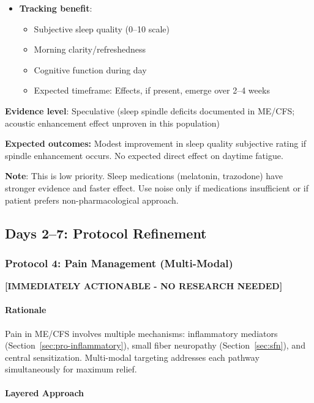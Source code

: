 \begin{recommendation}
\begin{itemize}
    \item \textbf{Tracking benefit}:
    \begin{itemize}
        \item Subjective sleep quality (0--10 scale)
        \item Morning clarity/refreshedness
        \item Cognitive function during day
        \item Expected timeframe: Effects, if present, emerge over 2--4 weeks
    \end{itemize}
\end{itemize}

\textbf{Evidence level}: Speculative (sleep spindle deficits documented in ME/CFS; acoustic enhancement effect unproven in this population)

\textbf{Expected outcomes:} Modest improvement in sleep quality subjective rating if spindle enhancement occurs. No expected direct effect on daytime fatigue.

\textbf{Note}: This is low priority. Sleep medications (melatonin, trazodone) have stronger evidence and faster effect. Use noise only if medications insufficient or if patient prefers non-pharmacological approach.

\end{recommendation}

\subsection{Days 2--7: Protocol Refinement}
\label{sec:days-two-seven}

\subsubsection{Protocol 4: Pain Management (Multi-Modal)}

\textbf{[IMMEDIATELY ACTIONABLE - NO RESEARCH NEEDED]}

\paragraph{Rationale}
Pain in ME/CFS involves multiple mechanisms: inflammatory mediators (Section~\ref{sec:pro-inflammatory}), small fiber neuropathy (Section~\ref{sec:sfn}), and central sensitization. Multi-modal targeting addresses each pathway simultaneously for maximum relief.

\paragraph{Layered Approach}

